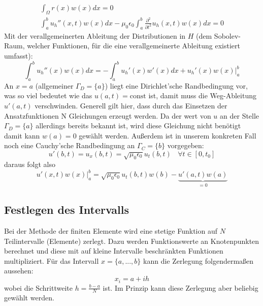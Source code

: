 	\begin{align}
	\int_{\Omega} r(x)w(x) dx = 0 \\
	\int_{a}^{b} u_h''(x,t) w(x) dx - \mu_0 \epsilon_0 \int_{a}^{b}\frac{\partial ^2 }{\partial t^2}u_h (x,t)w(x) dx =0 
	\label{weak-form}
	\end{align}
	Mit der verallgemeinerten Ableitung der Distributionen in $H$ (dem Sobolev-Raum, welcher Funktionen, für die eine verallgemeinerte Ableitung existiert umfasst):
	\begin{equation}
		\int_{a}^{b} u_h''(x) w(x) dx = -\int_{a}^{b} u_h'(x) w'(x) dx + u_h'(x)w(x) \vert_a^b 
		\label{distribution-differential}
	\end{equation}
	An $x=a$ (allgemeiner $\Gamma_D = \{a\}$) liegt eine Dirichlet'sche Randbedingung vor, was so viel bedeutet wie das $u(a,t)=\text{const}$ ist, damit muss die Weg-Ableitung $u'(a,t)$ verschwinden. Generell gilt hier, dass durch das Einsetzen der Ansatzfunktionen N Gleichungen erzeugt werden. Da der wert von $u$ an der Stelle $\Gamma_D = \{a\}$ allerdings bereits bekannt ist, wird diese Gleichung nicht benötigt damit kann $w(a)=0$ gewählt werden. Außerdem ist in unserem konkreten Fall noch eine Cauchy'sche Randbedingung an $\Gamma_C = \{b\}$ vorgegeben: 
	\[u'(b,t)=u_x(b,t) = \sqrt{\mu_0 \epsilon_0} u_t(b,t) ~~~~ \forall t \in  [0,t_0]\] daraus folgt also
	\begin{equation}
		u'(x,t)w(x) \vert_a^b = \sqrt{\mu_0 \epsilon_0} u_t (b,t) w(b) - \underbrace{u'(a,t)w(a)}_{=0}
	\end{equation}
	
	\subsection{Festlegen des Intervalls}
	Bei der Methode der finiten Elemente wird eine stetige Funktion auf $N$ Teilintervalle (Elemente) zerlegt. Dazu werden Funktionswerte an Knotenpunkten berechnet und diese mit auf kleine Intervalle beschränkten Funktionen multipliziert. Für das Intervall $x = \{a,...,b\}$ kann die Zerlegung folgendermaßen aussehen:
	\begin{equation}
	x_i = a + i h
	\end{equation}
	wobei die Schrittweite $h=\frac{b-a}{N}$ ist. Im Prinzip kann diese Zerlegung aber beliebig gewählt werden.

